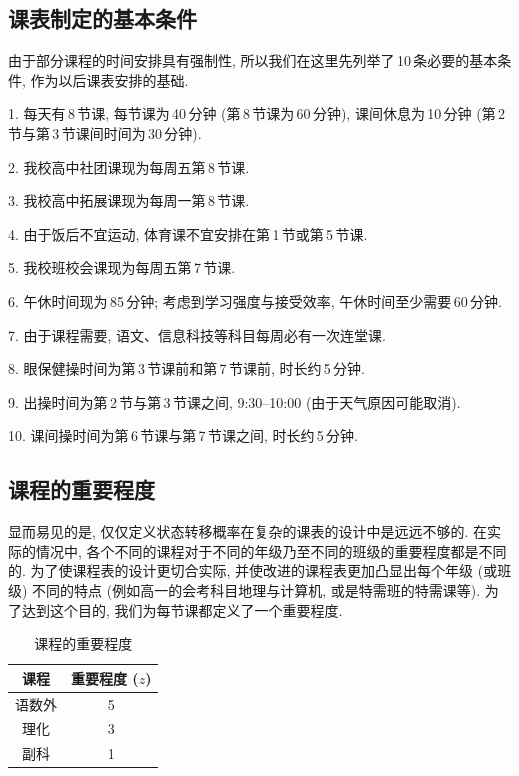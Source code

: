 \documentclass[a4paper]{article}
\begin{document}
 \subsection{课表制定的基本条件}
  由于部分课程的时间安排具有强制性, 所以我们在这里先列举了\,10\,条必要的基本条件, 作为以后课表安排的基础.\par
  1. 每天有\,8\,节课, 每节课为\,40\,分钟 (第\,8\,节课为\,60\,分钟), 课间休息为\,10\,分钟 (第\,2\,节与第\,3\,节课间时间为\,30\,分钟).\par
  2. 我校高中社团课现为每周五第\,8\,节课.\par
  3. 我校高中拓展课现为每周一第\,8\,节课.\par
  4. 由于饭后不宜运动, 体育课不宜安排在第\,1\,节或第\,5\,节课.\par
  5. 我校班校会课现为每周五第\,7\,节课.\par
  6. 午休时间现为\,85\,分钟; 考虑到学习强度与接受效率, 午休时间至少需要\,60\,分钟.\par
  7. 由于课程需要, 语文、信息科技等科目每周必有一次连堂课.\par
  8. 眼保健操时间为第\,3\,节课前和第\,7\,节课前, 时长约\,5\,分钟.\par
  9. 出操时间为第\,2\,节与第\,3\,节课之间, 9:30--10:00 (由于天气原因可能取消).\par
  10. 课间操时间为第\,6\,节课与第\,7\,节课之间, 时长约\,5\,分钟.
 \subsection{课程的重要程度}
  显而易见的是, 仅仅定义状态转移概率在复杂的课表的设计中是远远不够的. 在实际的情况中, 各个不同的课程对于不同的年级乃至不同的班级的重要程度都是不同的. 为了使课程表的设计更切合实际, 并使改进的课程表更加凸显出每个年级 (或班级) 不同的特点 (例如高一的会考科目地理与计算机, 或是特需班的特需课等). 为了达到这个目的, 我们为每节课都定义了一个重要程度.
  \begin{table}[H]
  \centering
  \begin{tabular}{|c|c|}
  \hline
  \bf 课程 & \bf 重要程度 ($z$) \\\hline
  语数外 & 5 \\\hline
  理化 & 3 \\\hline
  副科 & 1 \\\hline
  \end{tabular}
  \caption{课程的重要程度}
  \end{table}
\end{document}
